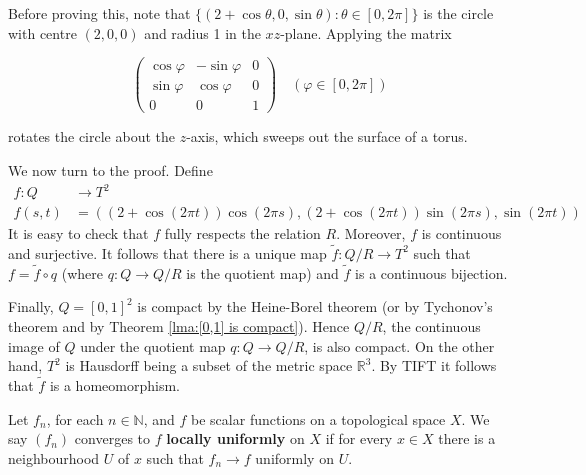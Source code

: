 \documentclass[a4paper]{article}
\begin{document}
Before proving this, note that $\{(2+\cos \theta, 0, \sin \theta): \theta \in[0,2 \pi]\}$ is the circle with centre $(2,0,0)$ and radius 1 in the $x z$-plane. Applying the matrix

$$
\left(\begin{array}{ccc}
\cos \varphi & -\sin \varphi & 0 \\
\sin \varphi & \cos \varphi & 0 \\
0 & 0 & 1
\end{array}\right) \quad(\varphi \in[0,2 \pi])
$$

rotates the circle about the $z$-axis, which sweeps out the surface of a torus. 

We now turn to the proof. Define
$$
\begin{aligned}
f: Q & \rightarrow T^{2} \\
f(s, t) &=((2+\cos (2 \pi t)) \cos (2 \pi s),(2+\cos (2 \pi t)) \sin (2 \pi s), \sin (2 \pi t))
\end{aligned}
$$
It is easy to check that $f$ fully respects the relation $R$. Moreover, $f$ is continuous and surjective. It follows that there is a unique map $\tilde{f}: Q / R \rightarrow T^{2}$ such that $f=\tilde{f} \circ q$ (where $q: Q \rightarrow Q / R$ is the quotient map) and $\tilde{f}$ is a continuous bijection.

Finally, $Q=[0,1]^{2}$ is compact by the Heine-Borel theorem (or by Tychonov's theorem and by Theorem \ref{lma:[0,1] is compact}). Hence $Q / R$, the continuous image of $Q$ under the quotient map $q: Q \rightarrow Q / R$, is also compact. On the other hand, $T^{2}$ is Hausdorff being a subset of the metric space $\mathbb{R}^{3}$. By TIFT it follows that $\tilde{f}$ is a homeomorphism.

\begin{definition}
    Let $f_{n}$, for each $n \in \mathbb{N}$, and $f$ be scalar functions on a topological space $X$. We say $\left(f_{n}\right)$ converges to $f$ \textbf{locally uniformly} on $X$ if for every $x \in X$ there is a neighbourhood $U$ of $x$ such that $f_{n} \rightarrow f$ uniformly on $U$.
\end{definition}
\end{document}

